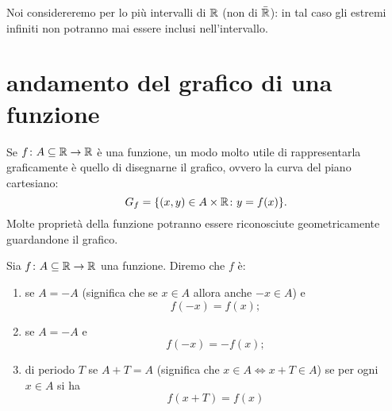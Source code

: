 Noi considereremo per lo più intervalli di $\mathbb R$ (non di $\bar {\mathbb R}$): in tal
caso gli estremi infiniti non potranno mai essere inclusi nell'intervallo.

\begin{comment}
Finora abbiamo sempre supposto $a \le b$.
Se invece $a>b$ potremmo definire per convenzione:
\begin{equation}\label{eq:488364}
  [a,b] = [b,a], \quad
  [a,b) = (b,a], \quad
  (a,b] = [b,a), \quad
  (a,b) = (b,a).
\end{equation}
Si faccia però attenzione che in altri testi gli intervalli con gli estremi
scambiati non vengono definiti oppure vengono considerati vuoti.

La convenzione può essere utile perché in generale se $\vec a, \vec b$ sono
elementi di uno spazio vettoriale reale $V$ allora ha senso
definire:
\begin{align*}
    [\vec a,\vec b] &= \ENCLOSE{(1-t)\vec a + t \vec b\colon t\in [0,1]},\\
    [\vec a,\vec b) &= \ENCLOSE{(1-t)\vec a + t \vec b\colon t\in [0,1)},\\
    (\vec a,\vec b] &= \ENCLOSE{(1-t)\vec a + t \vec b\colon t\in (0,1]},\\
    (\vec a,\vec b) &= \ENCLOSE{(1-t)\vec a + t \vec b\colon t\in (0,1)}.
\end{align*}
L'intervallo $[\vec a,\vec b]$ è quindi il segmento di estremi
$\vec a$ e $\vec b$ e può essere definito anche se sullo spazio
vettoriale non è dato un ordinamento.
Ma questo rimane coerente con la definizione~\eqref{eq:499494}
data sopra solamente se adottiamo la convenzione~\eqref{eq:488364}.
\end{comment}

\section{andamento del grafico di una funzione}
%
Se $f\colon A \subseteq \mathbb R\to \mathbb R$ è una funzione, un modo molto
utile di rappresentarla graficamente è quello di disegnarne il
grafico, ovvero la curva del piano cartesiano:
\[
   G_f = {\left\{ (x,y)\in A\times \mathbb R\colon y = f(x) \right\}}.
\]
Molte proprietà della funzione potranno essere riconosciute
geometricamente guardandone il grafico.

\begin{definition}[simmetrie]
Sia $f\colon A \subseteq \mathbb R \to \mathbb R$ una funzione.
Diremo che $f$ è:
\begin{enumerate}
\item {}
%
se $A=-A$ (significa che se $x\in A$ allora anche $-x\in A$) e
\[
  f(-x) = f(x);
\]
\item {}
%
se $A=-A$ e
\[
  f(-x) = -f(x);
\]
\item {}
%
di periodo $T$ se $A+T=A$
(significa che $x\in A \iff x+T \in A$)
se per ogni $x\in A$ si ha
\[
  f(x+T)=f(x)
\]
\end{enumerate}
\end{definition}

